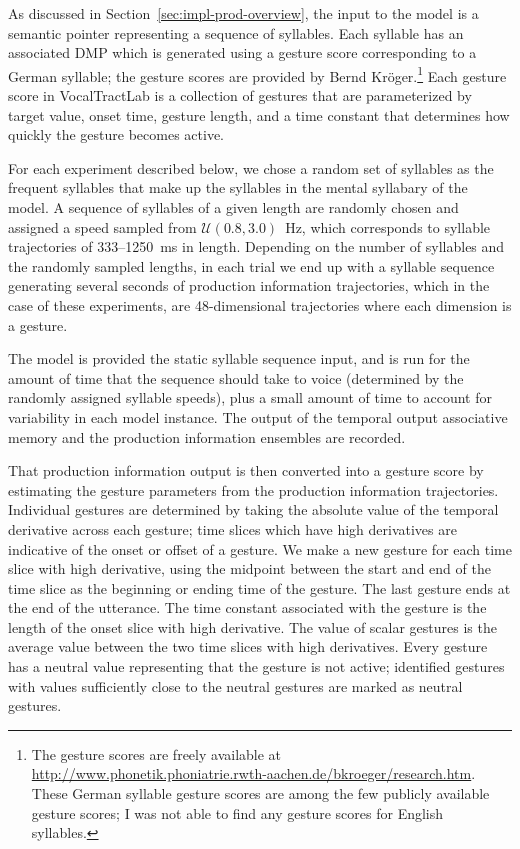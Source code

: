 As discussed in Section~\ref{sec:impl-prod-overview},
the input to the model
is a semantic pointer
representing a sequence of syllables.
Each syllable has an associated DMP
which is generated using
a gesture score corresponding to
a German syllable;
the gesture scores are provided by
Bernd Kr\"{o}ger.\footnote{
  The gesture scores are freely available at
  \url{http://www.phonetik.phoniatrie.rwth-aachen.de/bkroeger/research.htm}.
  These German syllable gesture scores are among
  the few publicly available gesture scores;
  I was not able to find any gesture scores
  for English syllables.}
Each gesture score in VocalTractLab
is a collection of
gestures that are parameterized by target value,
onset time, gesture length,
and a time constant that determines
how quickly the gesture becomes active.

For each experiment described below,
we chose a random set of syllables
as the frequent syllables
that make up the syllables
in the mental syllabary of the model.
A sequence of syllables of a given length
are randomly chosen and assigned a speed
sampled from $\mathcal{U}(0.8, 3.0)$~Hz,
which corresponds to syllable trajectories of
333--1250~ms in length.
Depending on the number of syllables
and the randomly sampled lengths,
in each trial we end up with a syllable sequence
generating several seconds
of production information trajectories,
which in the case of these experiments,
are 48-dimensional trajectories
where each dimension is a gesture.

The model is provided the static syllable sequence input,
and is run for the amount of time that the sequence
should take to voice (determined by the
randomly assigned syllable speeds),
plus a small amount of time to account
for variability in each model instance.
The output of the temporal output associative memory
and the production information ensembles
are recorded.

That production information output is then converted
into a gesture score
by estimating the gesture parameters
from the production information trajectories.
Individual gestures are determined by
taking the absolute value of the temporal derivative
across each gesture;
time slices which have high derivatives
are indicative of the onset or offset of a gesture.
We make a new gesture for each
time slice with high derivative,
using the midpoint between the
start and end of the time slice
as the beginning or ending time
of the gesture.
The last gesture ends at the end
of the utterance.
The time constant associated
with the gesture
is the length of
the onset slice with high derivative.
The value of scalar gestures is the
average value between the two
time slices with high derivatives.
Every gesture has a neutral value
representing that the gesture
is not active;
identified gestures with values
sufficiently close to the neutral gestures
are marked as neutral gestures.

